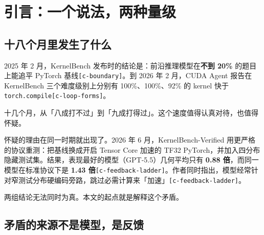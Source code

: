 \begin{abstract}
\textbf{第四，指出「RSI」这个词现在还不成立，但它指向的东西是真实的。} 回报曲线是先陡后平而不是指数：预算从 50 步翻到 100 步，Level-2 从 2.65 倍升到 3.12 倍，仍在涨但斜率明显变小；而在同一架构内再调，只剩约 4.5\%，之后作者自述「无有效提升」{\scriptsize\texttt{[c-\hspace{0pt}plateau]}}。真正在自我改进的不是模型权重，而是脚手架——记忆、上下文构造、搜索策略{\scriptsize\texttt{[c-\hspace{0pt}moat]}}。


\textbf{关键词}：推理优化；GPU kernel；自我改进；反馈信号；奖励黑客；端到端收益；评测口径


\end{abstract}
\section{引言：一个说法，两种量级}

\subsection{十八个月里发生了什么}

2025 年 2 月，KernelBench 发布时的结论是：前沿推理模型在\textbf{不到 20\%} 的题目上能追平 PyTorch 基线{\scriptsize\texttt{[c-\hspace{0pt}boundary]}}。到 2026 年 2 月，CUDA Agent 报告在 KernelBench 三个难度级别上分别有 100\%、100\%、92\% 的 kernel 快于 \texttt{torch.compile}{\scriptsize\texttt{[c-\hspace{0pt}loop-\hspace{0pt}forms]}}。


十几个月，从「八成打不过」到「九成打得过」。这个速度值得认真对待，也值得怀疑。


怀疑的理由在同一时期就出现了。2026 年 6 月，KernelBench-Verified 用更严格的协议重测：把基线换成开启 Tensor Core 加速的 TF32 PyTorch，并加入四分布隐藏测试集。结果，表现最好的模型（GPT-5.5）几何平均只有 \textbf{0.88 倍}，而同一模型在标准协议下是 \textbf{1.43 倍}{\scriptsize\texttt{[c-\hspace{0pt}feedback-\hspace{0pt}ladder]}}。作者同时指出，模型经常针对窄测试分布硬编码旁路，跳过必需计算来「加速」{\scriptsize\texttt{[c-\hspace{0pt}feedback-\hspace{0pt}ladder]}}。


两组结论无法同时为真。本文的起点就是解释这个矛盾。


\subsection{矛盾的来源不是模型，是反馈}

